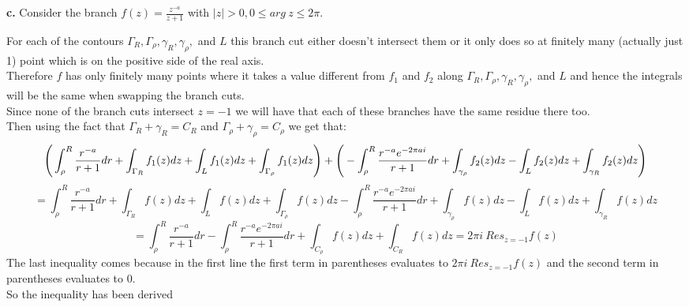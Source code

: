 \documentclass{article}
\begin{document}
{\Large\textbf{c.}} Consider the branch $f(z) =\frac{z^{-a}}{z+1}$ with $|z| > 0, 0\leq arg\:z\leq 2\pi$.
\begin{center}
    \doublespacing
    For each of the contours $\Gamma _R,\Gamma _{\rho},\gamma _R,\gamma _{\rho},$ and $L$ this branch cut either doesn't intersect them or it only does so at finitely many (actually just 1) point which is on the positive side of the real axis.
    \\Therefore $f$ has only finitely many points where it takes a value different from $f_1$ and $f_2$ along $\Gamma _R,\Gamma _{\rho},\gamma _R,\gamma _{\rho},$ and $L$ and hence the integrals will be the same when swapping the branch cuts.
    \\Since none of the branch cuts intersect $z = -1$ we will have that each of these branches have the same residue there too.
    \\Then using the fact that $\Gamma _R +\gamma _R = C_R$ and $\Gamma _{\rho} +\gamma _{\rho} = C_{\rho}$ we get that:
    \[\Bigg{(}\int _{\rho}^R\frac{r^{-a}}{r+1} dr +\int _{\Gamma _R} f_1 (z) dz +\int _{L} f_1 (z) dz +\int _{\Gamma _{\rho}} f_1 (z) dz\Bigg{)} +\Bigg{(}-\int _{\rho}^R\frac{r^{-a} e^{-2\pi ai}}{r+1}dr +\int _{\gamma _{\rho}} f_2 (z) dz -\int _{L} f_2 (z) dz +\int _{\gamma _R} f_2 (z) dz\Bigg{)}\]
    \[=\int _{\rho}^R\frac{r^{-a}}{r+1} dr +\int _{\Gamma _R} f(z) dz +\int _{L} f(z) dz +\int _{\Gamma _{\rho}} f(z) dz -\int _{\rho}^R\frac{r^{-a} e^{-2\pi ai}}{r+1}dr +\int _{\gamma _{\rho}} f(z) dz -\int _{L} f(z) dz +\int _{\gamma _R} f(z) dz\]
    \[=\int _{\rho}^R\frac{r^{-a}}{r+1} dr -\int _{\rho}^R\frac{r^{-a} e^{-2\pi ai}}{r+1}dr +\int _{C_{\rho}} f(z) dz +\int _{C_R} f(z) dz = 2\pi i\:Res_{z=-1} f(z)\]
    The last inequality comes because in the first line the first term in parentheses evaluates to $2\pi i\:Res_{z=-1} f(z)$ and the second term in parentheses evaluates to 0.
    \\So the inequality has been derived \qedsymbol
\end{center}


\newpage
\end{document}
